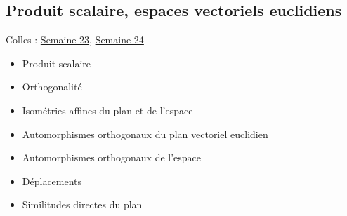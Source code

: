\subsection{Produit scalaire, espaces vectoriels euclidiens}
Colles : \href{S23.pdf}{Semaine 23}, \href{S24.pdf}{Semaine 24}
\begin{itemize}
\item Produit scalaire
\item Orthogonalit\'e
\item Isom\'etries affines du plan et de l'espace
\item Automorphismes orthogonaux du plan vectoriel euclidien
\item Automorphismes orthogonaux de l'espace
\item D{\'e}placements
\item Similitudes directes du plan
\end{itemize}


